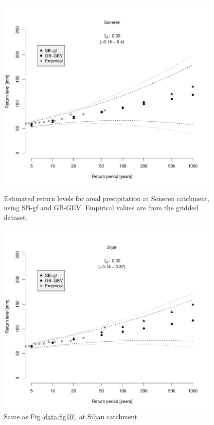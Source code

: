 \documentclass[12pt,a4paper,english]{article}
\begin{document}
\begin{figure}[!htbp]
\begin{minipage}[t]{0.50\textwidth}
\centering
\includegraphics[width = \linewidth]{Figs/compareMT_Soneren.pdf}
\caption[]{\label{data:fig10}Estimated return levels for areal precipitation at Soneren catchment, using SB-gf and GB-GEV. Empirical values are from the gridded dataset.}
\end{minipage}
\hspace{10mm}
\begin{minipage}[t]{0.50\textwidth}
\centering
\includegraphics[width = \linewidth]{Figs/compareMT_Siljan.pdf}
\caption[]{\label{data:fig11}Same as Fig.\ref{data:fig10}, at Siljan catchment.}
\end{minipage}
\end{figure}
\end{document}
